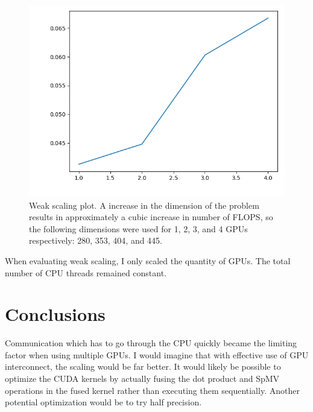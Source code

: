 \documentclass{article}
\begin{document}
\begin{figure}[H] 
  \centering
  \includegraphics[width=0.8\linewidth]{../weak_scaling.png}
  \caption{Weak scaling plot. A increase in the dimension of the problem
  results in approximately a cubic increase in number of FLOPS, so the
following dimensions were used for 1, 2, 3, and 4 GPUs respectively: 
280, 353, 404, and 445.}
\end{figure}

When evaluating weak scaling, I only scaled the quantity of GPUs. The total
number of CPU threads remained constant. \\

\section{Conclusions}

Communication which has to go through the CPU quickly became the limiting
factor when using multiple GPUs. I would imagine that with effective use of GPU
interconnect, the scaling would be far better. It would likely be possible to
optimize the CUDA kernels by actually fusing the dot product and SpMV
operations in the fused kernel rather than executing them sequentially.
Another potential optimization would be to try half precision. 
\end{document}
